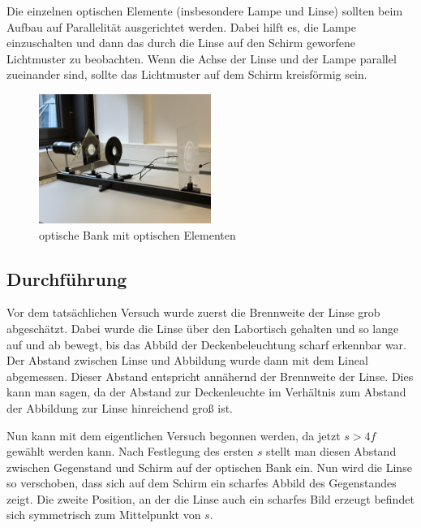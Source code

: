 \documentclass[a4paper,12pt]{article}
\begin{document}
Die einzelnen optischen Elemente (insbesondere Lampe und Linse) sollten beim Aufbau auf Parallelität
ausgerichtet werden. Dabei hilft es, die Lampe einzuschalten und dann das durch die Linse auf den
Schirm geworfene Lichtmuster zu beobachten. Wenn die Achse der Linse und der Lampe parallel zueinander
sind, sollte das Lichtmuster auf dem Schirm kreisförmig sein.

\begin{figure}[H]
    \centering
    \includegraphics[width=0.5\textwidth]{bilder/Versuchsaufbau1.jpg}           %
    \caption{optische Bank mit optischen Elementen}                             %
    \label{Abb:Versuchsaufbau1}
\end{figure}

\subsection{Durchführung}
\label{sec:Durchfuehrung}

Vor dem tatsächlichen Versuch wurde zuerst die Brennweite der Linse grob abgeschätzt.
Dabei wurde die Linse über den Labortisch gehalten und so lange auf und ab bewegt, bis das
Abbild der Deckenbeleuchtung scharf erkennbar war. Der Abstand zwischen Linse und Abbildung
wurde dann mit dem Lineal abgemessen. Dieser Abstand entspricht annähernd der Brennweite
der Linse. Dies kann man sagen, da der Abstand zur Deckenleuchte im Verhältnis zum Abstand
der Abbildung zur Linse hinreichend groß ist.

Nun kann mit dem eigentlichen Versuch begonnen werden, da jetzt $s>4f$ gewählt werden kann.
Nach Festlegung des ersten $s$ stellt man diesen Abstand zwischen Gegenstand und Schirm auf der
optischen Bank ein. Nun wird die Linse so verschoben, dass sich auf dem Schirm ein scharfes
Abbild des Gegenstandes zeigt. Die zweite Position, an der die Linse auch ein scharfes Bild erzeugt
befindet sich symmetrisch zum Mittelpunkt von $s$. 
\end{document}
